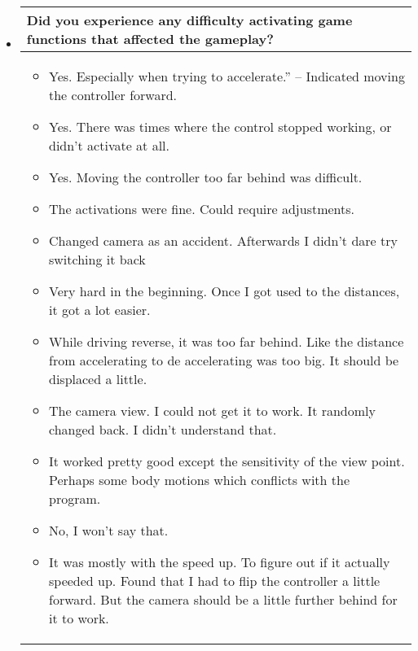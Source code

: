 \begin{itemize}
\item[]
\begin{table}[!htb]
\centering
\begin{tabular}{| p{5.5in} |}
\hline
	\cellcolor{NotSkyBlue}\textbf{Did you experience any difficulty activating game functions that affected the gameplay?}
	\\
	\hline
	\begin{itemize}
        \item Yes. Especially when trying to accelerate.” – Indicated moving the controller forward.
        \item Yes.  There was times where the control stopped working, or didn’t activate at all.
        \item Yes. Moving the controller too far behind was difficult.
        \item The activations were fine. Could require adjustments.
        \item Changed camera as an accident. Afterwards I didn’t dare try switching it back
        \item Very hard in the beginning. Once I got used to the distances, it got a lot easier.
        \item While driving reverse, it was too far behind. Like the distance from accelerating to de accelerating was too big.  It should be displaced a little.
        \item The camera view. I could not get it to work. It randomly changed back. I didn’t understand that.
        \item It worked pretty good except the sensitivity of the view point. Perhaps some body motions which conflicts with the  program.
        \item No, I won’t say that.
        \item It was mostly with the speed up. To figure out if it actually speeded up. Found that I had to flip the controller a little forward. But the camera should be a little further behind for it to work.

	\end{itemize}
	\\
	\hline
\end{tabular}
\end{table}


\end{itemize}
